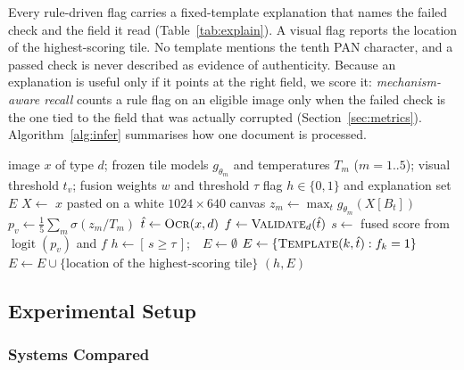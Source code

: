 \documentclass[12pt]{article}
\begin{document}
Every rule-driven flag carries a fixed-template explanation that names
the failed check and the field it read (Table~\ref{tab:explain}). A
visual flag reports the location of the highest-scoring tile. No
template mentions the tenth PAN character, and a passed check is never
described as evidence of authenticity. Because an explanation is useful
only if it points at the right field, we score it:
\emph{mechanism-aware recall} counts a rule flag on an eligible image
only when the failed check is the one tied to the field that was
actually corrupted (Section~\ref{sec:metrics}).
Algorithm~\ref{alg:infer} summarises how one document is processed.

\begin{algorithm}[!t]
\caption{Verification of one document image}
\label{alg:infer}
\begin{algorithmic}[1]
\Require image $x$ of type $d$; frozen tile models $g_{\theta_m}$ and
  temperatures $T_m$ ($m=1..5$); visual threshold $t_v$; fusion weights
  $w$ and threshold $\tau$
\Ensure flag $h\in\{0,1\}$ and explanation set $E$
\State $X\gets$ $x$ pasted on a white $1024{\times}640$ canvas
  \State $z_m\gets\max_t g_{\theta_m}(X[B_t])$ \Comment{(\ref{eq:maxtile})}
\EndFor
\State $p_v\gets\frac{1}{5}\sum_m\sigma(z_m/T_m)$ \Comment{(\ref{eq:calib})}
\State $\hat t\gets\textsc{Ocr}(x,d)$ 
\State $f\gets\textsc{Validate}_d(\hat t)$ 
\State $s\gets$ fused score from $\operatorname{logit}(p_v)$ and $f$ 
\State $h\gets[\,s\ge\tau\,]$;\ \ $E\gets\emptyset$
  \State $E\gets\{\textsc{Template}(k,\hat t): f_k=1\}$ 
    \State $E\gets E\cup\{\text{location of the highest-scoring tile}\}$
  \EndIf
\EndIf
\State \Return $(h,E)$
\end{algorithmic}
\end{algorithm}


\subsection{Experimental Setup}
\label{sec:setup}

\subsubsection{Systems Compared}
\label{subsec:configs}
\end{document}
